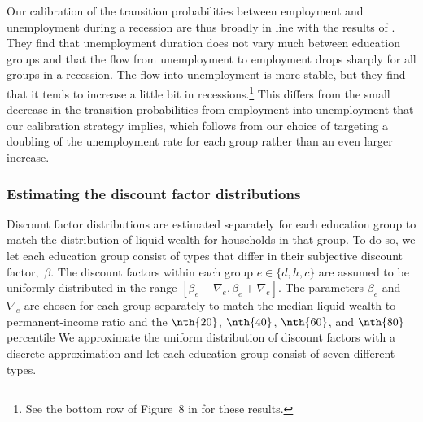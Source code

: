 \documentclass[\PathToRoot/\ProjectName]{subfiles}
\begin{document}
Our calibration of the transition probabilities between employment and unemployment during a recession are thus broadly in line with the results of \cite{elsby2010labor}. They find that unemployment duration does not vary much between education groups and that the flow from unemployment to employment drops sharply for all groups in a recession. The flow into unemployment is more stable, but they find that it tends to increase a little bit in recessions.\footnote{See the bottom row of Figure~8 in \cite{elsby2010labor} for these results.} This differs from the small decrease in the transition probabilities from employment into unemployment that our calibration strategy implies, which follows from our choice of targeting a doubling of the unemployment rate for each group rather than an even larger increase.



\subsubsection{Estimating the discount factor distributions}
\whenintegrated{\label{sec:estimBetas}}

Discount factor distributions are estimated separately for each education group to match the distribution of liquid wealth for households in that group.
To do so, we let each education group consist of types that differ in their subjective discount factor,~$\beta$.
The discount factors within each group $e\in \{d, h, c\}$ are assumed to be uniformly distributed in the range $[\beta_e-\nabla_e, \beta_e+\nabla_e]$.
The parameters $\beta_e$ and $\nabla_e$ are chosen for each group separately to match the median liquid-wealth-to-permanent-income ratio and the $\nth{20}$, $\nth{40}$, $\nth{60}$, and $\nth{80}$ percentile 
We approximate the uniform distribution of discount factors with a discrete approximation and let each education group consist of seven different types.
\end{document}
